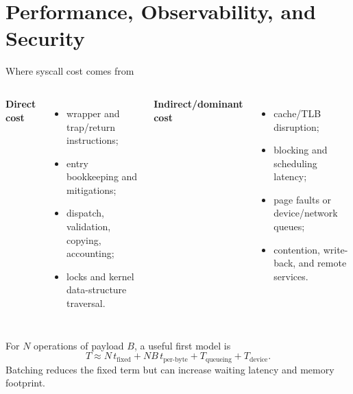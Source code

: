 \documentclass[aspectratio=169,11pt]{beamer}
\begin{document}
\section{Performance, Observability, and Security}

\begin{frame}{Where syscall cost comes from}
  \begin{columns}[T,onlytextwidth]
      \textbf{Direct cost}
      \begin{itemize}
        \item wrapper and trap/return instructions;
        \item entry bookkeeping and mitigations;
        \item dispatch, validation, copying, accounting;
        \item locks and kernel data-structure traversal.
      \end{itemize}
      \textbf{Indirect/dominant cost}
      \begin{itemize}
        \item cache/TLB disruption;
        \item blocking and scheduling latency;
        \item page faults or device/network queues;
        \item contention, write-back, and remote services.
      \end{itemize}
  \end{columns}
  \begin{tcolorbox}[title=Simple cost model]
    For $N$ operations of payload $B$, a useful first model is
    \[
      T \approx N\,t_{\text{fixed}} + NB\,t_{\text{per-byte}} + T_{\text{queueing}} + T_{\text{device}}.
    \]
    Batching reduces the fixed term but can increase waiting latency and memory footprint.
  \end{tcolorbox}
\end{frame}
\end{document}
